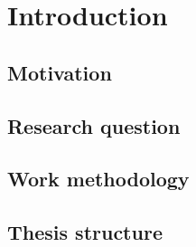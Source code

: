 \chapter{Introduction} \label{Introduction}

\section{Motivation}

\section{Research question}

\section{Work methodology}

\section{Thesis structure}
